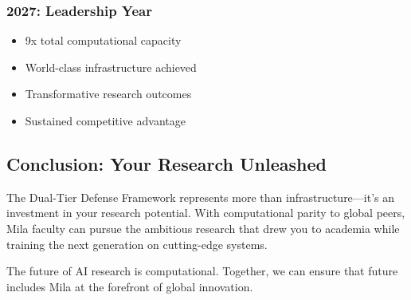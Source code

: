 \subsubsection{2027: Leadership Year}
\begin{itemize}
\item 9x total computational capacity
\item World-class infrastructure achieved
\item Transformative research outcomes
\item Sustained competitive advantage
\end{itemize}

\subsection{Conclusion: Your Research Unleashed}

The Dual-Tier Defense Framework represents more than infrastructure---it's an investment in your research potential. With computational parity to global peers, Mila faculty can pursue the ambitious research that drew you to academia while training the next generation on cutting-edge systems.

The future of AI research is computational. Together, we can ensure that future includes Mila at the forefront of global innovation.
